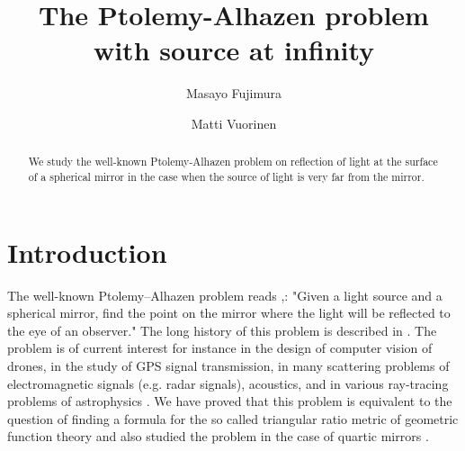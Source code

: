 \documentclass[12pt,a4paper]{amsart}
\newcounter{minutes}
\newcounter{hours}
\theoremstyle{plain}
\theoremstyle{definition}
\theoremstyle{remark}
\numberwithin{equation}{section}
\begin{document}
\thispagestyle{empty}
\def\thefootnote{}


\title[The Ptolemy-Alhazen problem]{The Ptolemy-Alhazen problem with source
at infinity}


\author[M. Fujimura]{Masayo Fujimura }
\address{Department of Mathematics,
National Defense Academy of Japan, Yokosuka, Japan\newline
\href{https://orcid.org/0000-0002-5837-8167}{{\tt https://orcid.org/0000-0002-5837-8167}}
}
%
\author[M. Vuorinen]{Matti Vuorinen }
\address{Department of Mathematics and Statistics,
University of Turku, Finland\newline
\href{https://orcid.org/0000-0002-1734-8228}{{\tt https://orcid.org/0000-0002-1734-8228}}
}
\date{}

\begin{abstract}
We study the well-known Ptolemy-Alhazen problem on reflection of light
at the surface of a spherical mirror in the case when the source of light
is very far from the mirror.
\end{abstract}


\maketitle


\makeatletter

\makeatother




\section{Introduction}

The well-known
Ptolemy--Alhazen problem reads \cite{s},\cite[p.1010]{gbl}: "Given a light source and a spherical mirror, find the point on the mirror where the light 
will be reflected to the eye of an observer." The long history of this problem is described in \cite{s,fmv2,w}.  The problem is of current interest for instance in the design of
computer vision of drones, in the study of GPS signal transmission,  in many scattering
problems of electromagnetic signals (e.g. radar signals), acoustics, and in various ray-tracing problems  of
astrophysics \cite{atr,dsggh,le, m, dg1,dg2}.  We have proved that this problem is equivalent
to the question of finding a formula for the so called triangular ratio metric of geometric function theory
and also studied the problem in the case of quartic mirrors \cite{fhmv,fmv1, fmv2,hkv}.
\end{document}
